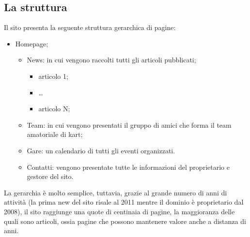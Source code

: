 	\subsection{La struttura}
		Il sito presenta la seguente struttura gerarchica di pagine:
		\begin{itemize}
			\item Homepage;
				\begin{itemize}
					\item News: in cui vengono raccolti tutti gli articoli pubblicati;
						\begin{itemize}
							\item articolo 1;
							\item \dots
							\item articolo N;
						\end{itemize}
					\item Team: in cui vengono presentati il gruppo di amici che forma il team amatoriale di kart;
					\item Gare: un calendario di tutti gli eventi organizzati.
					\item Contatti: vengono presentate tutte le informazioni del proprietario e gestore del sito.
				\end{itemize}
		\end{itemize}
		
		La gerarchia è molto semplice, tuttavia, grazie al grande numero di anni di attività (la prima new del sito risale al 2011 mentre il dominio è proprietario dal 2008), il sito raggiunge una quote di centinaia di pagine, la maggioranza delle quali sono articoli, ossia pagine che possono mantenere valore anche a distanza di anni.
		
		